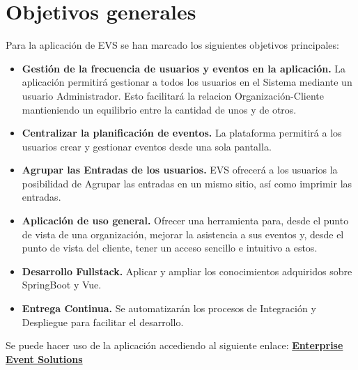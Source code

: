 
\section{Objetivos generales}

Para la aplicación de EVS se han marcado los siguientes objetivos principales:
\begin{itemize}
    \item \textbf{Gestión de la frecuencia de usuarios y eventos en la aplicación.} La aplicación permitirá gestionar a todos los usuarios en el Sistema
    mediante un usuario Administrador. Esto facilitará la relacion Organización-Cliente mantieniendo un equilibrio entre la cantidad de unos y de otros.
    \item \textbf{Centralizar la planificación de eventos.} La plataforma permitirá a los usuarios crear y gestionar eventos desde una sola pantalla.
    \item \textbf{Agrupar las Entradas de los usuarios.}  EVS ofrecerá a los usuarios la posibilidad de Agrupar las entradas en un mismo sitio, así como imprimir las entradas.
    \item \textbf{Aplicación de uso general.} Ofrecer una herramienta para, desde el punto de vista de una organización, mejorar la asistencia a sus eventos
    y, desde el punto de vista del cliente, tener un acceso sencillo e intuitivo a estos.
    \item \textbf{Desarrollo Fullstack.} Aplicar y ampliar los conocimientos adquiridos sobre SpringBoot y Vue.
    \item \textbf{Entrega Continua.} Se automatizarán los procesos de Integración y Despliegue para facilitar el desarrollo.
    \end{itemize}
   
    Se puede hacer uso de la aplicación accediendo al siguiente enlace: \textbf{\href{https://18.133.60.104:8443/}{Enterprise Event Solutions}}


